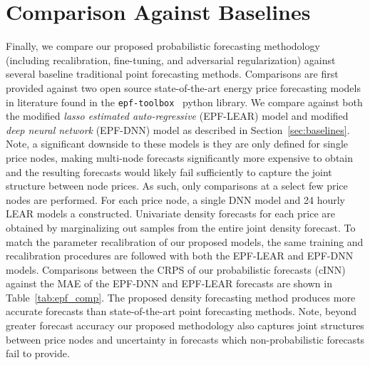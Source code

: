 \section{Comparison Against Baselines}\label{sec:comparison-against-baselines}

Finally, we compare our proposed probabilistic forecasting methodology (including recalibration, fine-tuning, and
adversarial regularization) against several baseline traditional point forecasting methods.
Comparisons are first provided against two open source state-of-the-art energy price forecasting models in literature
found in the \texttt{epf-toolbox}~\cite{epftoolbox} python library.
We compare against both the modified \textit{lasso estimated auto-regressive} (EPF-LEAR) model and modified
\textit{deep neural network} (EPF-DNN) model as described in Section~\ref{sec:baselines}.
Note, a significant downside to these models is they are only defined for single price nodes, making multi-node
forecasts significantly more expensive to obtain and the resulting forecasts would likely fail sufficiently to capture
the joint structure between node prices.
As such, only comparisons at a select few price nodes are performed.
For each price node, a single DNN model and 24 hourly LEAR models a constructed.
Univariate density forecasts for each price are obtained by marginalizing out samples from the entire joint density
forecast.
To match the parameter recalibration of our proposed models, the same training and recalibration procedures are followed
with both the EPF-LEAR and EPF-DNN models.
Comparisons between the CRPS of our probabilistic forecasts (cINN) against the MAE of the EPF-DNN and EPF-LEAR forecasts
are shown in Table~\ref{tab:epf_comp}.
The proposed density forecasting method produces more accurate forecasts than state-of-the-art point forecasting methods.
Note, beyond greater forecast accuracy our proposed methodology also captures joint structures between
price nodes and uncertainty in forecasts which non-probabilistic forecasts fail to provide.

